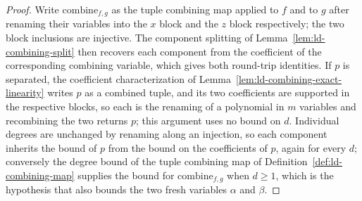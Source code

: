 \begin{proof}
	\leanok
	Write $\mathrm{combine}_{f,g}$ as the tuple combining map applied to $f$ and
	to $g$ after renaming their variables into the $x$ block and the $z$ block
	respectively; the two block inclusions are injective. The component
	splitting of Lemma~\ref{lem:ld-combining-split} then recovers each component
	from the coefficient of the corresponding combining variable, which gives
	both round-trip identities. If $p$ is separated, the
	coefficient characterization of
	Lemma~\ref{lem:ld-combining-exact-linearity} writes $p$ as a combined tuple,
	and its two coefficients are supported in the respective blocks, so each is
	the renaming of a polynomial in $m$ variables and recombining the two
	returns $p$; this argument uses no bound on $d$. Individual degrees are
	unchanged by renaming along an injection, so each component inherits the
	bound of $p$ from the bound on the coefficients of $p$, again for every $d$;
	conversely the degree bound of the tuple combining map of
	Definition~\ref{def:ld-combining-map} supplies the bound for
	$\mathrm{combine}_{f,g}$ when $d \ge 1$, which is the hypothesis that also
	bounds the two fresh variables $\alpha$ and $\beta$.
\end{proof}

